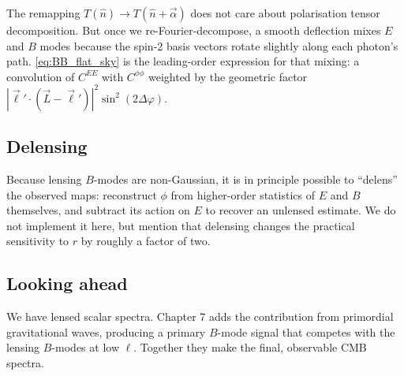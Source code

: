 \begin{physinsight}
The remapping $T(\hat n) \to T(\hat n + \vec\alpha)$ does not care about polarisation tensor decomposition. But once we re-Fourier-decompose, a smooth deflection mixes $E$ and $B$ modes because the spin-2 basis vectors rotate slightly along each photon's path. \cref{eq:BB_flat_sky} is the leading-order expression for that mixing: a convolution of $C^{EE}$ with $C^{\phi\phi}$ weighted by the geometric factor $|\vec\ell' \cdot (\vec L - \vec\ell')|^2 \sin^2(2\Delta\varphi)$.
\end{physinsight}

\subsection{Delensing}

Because lensing $B$-modes are non-Gaussian, it is in principle possible to ``delens'' the observed maps: reconstruct $\phi$ from higher-order statistics of $E$ and $B$ themselves, and subtract its action on $E$ to recover an unlensed estimate. We do not implement it here, but mention that delensing changes the practical sensitivity to $r$ by roughly a factor of two.

\subsection{Looking ahead}

We have lensed scalar spectra. Chapter 7 adds the contribution from primordial gravitational waves, producing a primary $B$-mode signal that competes with the lensing $B$-modes at low $\ell$. Together they make the final, observable CMB spectra.
